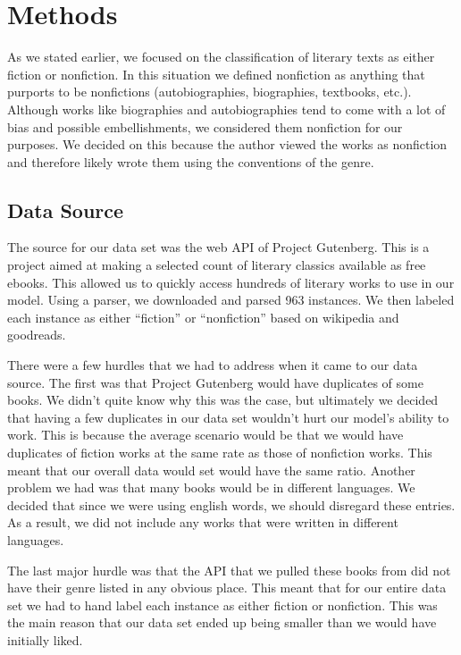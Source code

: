 \documentclass{article}
\begin{document}
\section{Methods}

As we stated earlier, we focused on the classification of literary texts as either fiction or nonfiction. In this situation we defined nonfiction as anything that purports to be nonfictions (autobiographies, biographies, textbooks, etc.). Although works like biographies and autobiographies tend to come with a lot of bias and possible embellishments, we considered them nonfiction for our purposes. We decided on this because the author viewed the works as nonfiction and therefore likely wrote them using the conventions of the genre.

\subsection{Data Source}

The source for our data set was the web API of Project Gutenberg. This is a project aimed at making a selected count of literary classics available as free ebooks. This allowed us to quickly access hundreds of literary works to use in our model. Using a parser, we downloaded and parsed 963 instances. We then labeled each instance as either “fiction” or “nonfiction” based on wikipedia and goodreads.\par
There were a few hurdles that we had to address when it came to our data source. The first was that Project Gutenberg would have duplicates of some books. We didn’t quite know why this was the case, but ultimately we decided that having a few duplicates in our data set wouldn’t hurt our model’s ability to work. This is because the average scenario would be that we would have duplicates of fiction works at the same rate as those of nonfiction works. This meant that our overall data would set would have the same ratio.
Another problem we had was that many books would be in different languages. We decided that since we were using english words, we should disregard these entries. As a result, we did not include any works that were written in different languages.\par
The last major hurdle was that the API that we pulled these books from did not have their genre listed in any obvious place. This meant that for our entire data set we had to hand label each instance as either fiction or nonfiction. This was the main reason that our data set ended up being smaller than we would have initially liked.\par
\end{document}
